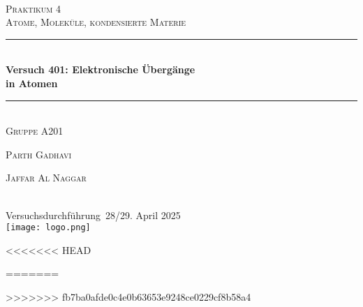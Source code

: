\documentclass[%
paper=a4,       %
fontsize=11pt,  %
ngerman         %
]{scrreprt}
\begin{document}
\begin{titlepage}
\newcommand{\HRule}{\rule{\linewidth}{0.5mm}}
\center{}
\textsc{\LARGE }\\[1.5cm] %
\textsc{\LARGE Praktikum 4}\\[0.5cm] %
\textsc{\large Atome, Moleküle, kondensierte Materie}\\[0.5cm] %

\HRule{}\\[0.4cm]
{ \huge \bfseries Versuch 401: Elektronische Übergänge\\[0.3cm] in Atomen}\\[0.4cm] %
\HRule{}\\[0.2cm]
\Large{\textsc{Gruppe A201}}\\[0.2cm]
 
\begin{minipage}{0.4\textwidth}
\begin{flushleft} \large
\textsc{Parth Gadhavi} %
\end{flushleft}
\end{minipage}
\begin{minipage}{0.4\textwidth}
\begin{flushright} \large
\textsc{Jaffar Al Naggar}
\end{flushright}
\end{minipage}\\[2.0cm]

{\large Versuchsdurchführung\, 28/29. April 2025 }\\[7.9cm] %

\texttt{[image: logo.png]}\\[1cm] %
 

\vfill %

\end{titlepage}
\tableofcontents
\clearpage
\clearpage
\setcounter{page}{1}




<<<<<<< HEAD

\listoffigures
\listoftables
\printbibliography{}
=======
\appendix
{}
\listoffigures{}
\listoftables{}

>>>>>>> fb7ba0afde0c4e0b63653e9248ce0229cf8b58a4
\end{document}
